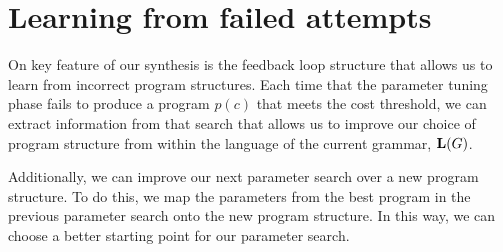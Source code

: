 \section{Learning from failed attempts}
\label{sec:feedback}

On key feature of our synthesis is the feedback loop structure that allows us to learn from incorrect program structures.
Each time that the parameter tuning phase fails to produce a program $p(c)$ that meets the cost threshold, we can extract information from that search that allows us to improve our choice of program structure from within the language of the current grammar, $\mathbf{L}(G)$.

Additionally, we can improve our next parameter search over a new program structure.
To do this, we map the parameters from the best program in the previous parameter search onto the new program structure.
In this way, we can choose a better starting point for our parameter search.
